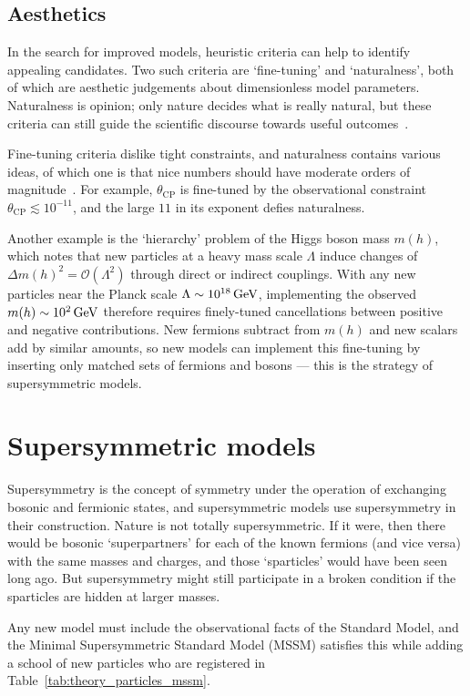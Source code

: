 \subsection{Aesthetics}
In the search for improved models, heuristic criteria can help to identify
appealing candidates.
Two such criteria are `fine-tuning' and `naturalness', both of which are
aesthetic judgements about dimensionless model parameters.
Naturalness is opinion; only nature decides what is really natural,
but these criteria can still guide the scientific discourse towards useful
outcomes~\cite{wells2020discovery}.

Fine-tuning criteria dislike tight constraints, and naturalness contains
various ideas, of which one is that nice numbers should have moderate orders of
magnitude~\cite{giudice2008naturally}.
For example, $\theta_\mathrm{CP}$ is fine-tuned by the observational constraint
$\theta_\mathrm{CP} \lesssim 10^{-11}$, and the large $11$ in its exponent
defies naturalness.

Another example is the `hierarchy' problem of the Higgs boson mass $m(h)$,
which notes that new particles at a heavy mass scale $\Lambda$ induce changes
of $\Delta m(h)^2 = \mathcal{O}(\Lambda^2)$
through direct or indirect couplings.
With any new particles near the Planck scale $\Lambda \sim 10^{18}\,\eV[G]$,
implementing the observed $m(h) \sim 10^{2}\,\eV[G]$ therefore requires
finely-tuned cancellations between positive and negative contributions.
New fermions subtract from $m(h)$ and new scalars add by similar amounts,
so new models can implement this fine-tuning by inserting only matched sets of
fermions and bosons --- this is the strategy of supersymmetric models.


\section{Supersymmetric models}
\label{sec:theory_susy}
Supersymmetry is the concept of symmetry under the operation of exchanging
bosonic and fermionic states, and supersymmetric models use supersymmetry in
their construction.
Nature is not totally supersymmetric.
If it were, then there would be bosonic `superpartners' for each of the known
fermions (and vice versa) with the same masses and charges, and those
`sparticles' would have been seen long ago.
But supersymmetry might still participate in a broken condition if the
sparticles are hidden at larger masses.

Any new model must include the observational facts of the Standard Model,
and the Minimal Supersymmetric Standard Model (MSSM) satisfies this while
adding a school of new particles
who are registered in Table~\ref{tab:theory_particles_mssm}.

